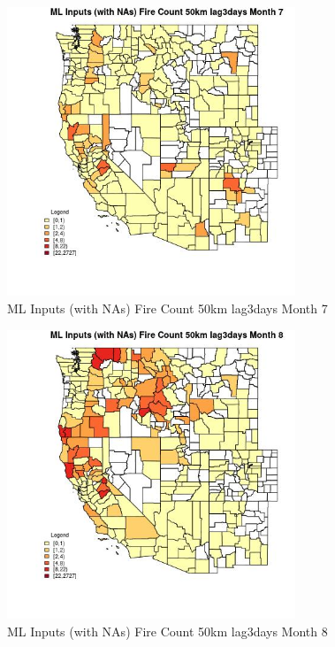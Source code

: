 \begin{figure} 
\centering  
\includegraphics[width=0.77\textwidth]{Code_Outputs/Report_ML_input_PM25_Step4_part_f_de_duplicated_aves_prioritize_24hr_obswNAs_CountyFire_Count_50km_lag3daysmedianMonth7.jpg} 
\caption{\label{fig:Report_ML_input_PM25_Step4_part_f_de_duplicated_aves_prioritize_24hr_obswNAsCountyFire_Count_50km_lag3daysmedianMonth7}ML Inputs (with NAs) Fire Count 50km lag3days Month 7} 
\end{figure} 
 

\begin{figure} 
\centering  
\includegraphics[width=0.77\textwidth]{Code_Outputs/Report_ML_input_PM25_Step4_part_f_de_duplicated_aves_prioritize_24hr_obswNAs_CountyFire_Count_50km_lag3daysmedianMonth8.jpg} 
\caption{\label{fig:Report_ML_input_PM25_Step4_part_f_de_duplicated_aves_prioritize_24hr_obswNAsCountyFire_Count_50km_lag3daysmedianMonth8}ML Inputs (with NAs) Fire Count 50km lag3days Month 8} 
\end{figure} 
 

